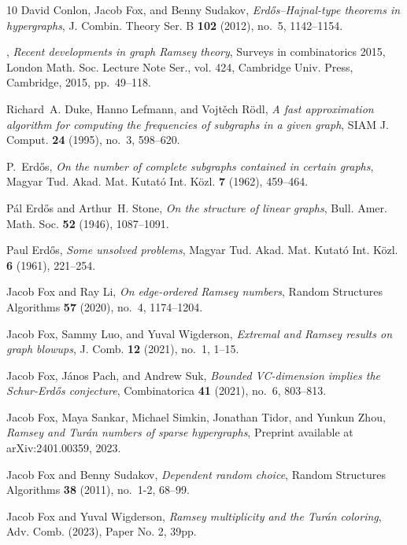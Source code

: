 \documentclass[11pt]{article}
\numberwithin{equation}{section}
\theoremstyle{plain}
\theoremstyle{remark}
\begin{document}
\begin{thebibliography}{10}
David Conlon, Jacob Fox, and Benny Sudakov, \emph{{Erd\H os}--{H}ajnal-type
  theorems in hypergraphs}, J. Combin. Theory Ser. B \textbf{102} (2012),
  no.~5, 1142--1154. 

\bysame, \emph{Recent developments in graph {R}amsey theory}, Surveys in
  combinatorics 2015, London Math. Soc. Lecture Note Ser., vol. 424, Cambridge
  Univ. Press, Cambridge, 2015, pp.~49--118. 

Richard~A. Duke, Hanno Lefmann, and Vojt\v{e}ch R\"{o}dl, \emph{A fast
  approximation algorithm for computing the frequencies of subgraphs in a given
  graph}, SIAM J. Comput. \textbf{24} (1995), no.~3, 598--620. 

P.~Erd\H{o}s, \emph{On the number of complete subgraphs contained in certain
  graphs}, Magyar Tud. Akad. Mat. Kutat\'{o} Int. K\"{o}zl. \textbf{7} (1962),
  459--464. 

P\'{a}l Erd\H{o}s and Arthur~H. Stone, \emph{On the structure of linear
  graphs}, Bull. Amer. Math. Soc. \textbf{52} (1946), 1087--1091. 

Paul Erd\H{o}s, \emph{Some unsolved problems}, Magyar Tud. Akad. Mat.
  Kutat\'{o} Int. K\"{o}zl. \textbf{6} (1961), 221--254. 

Jacob Fox and Ray Li, \emph{On edge-ordered {R}amsey numbers}, Random
  Structures Algorithms \textbf{57} (2020), no.~4, 1174--1204. 

Jacob Fox, Sammy Luo, and Yuval Wigderson, \emph{Extremal and {R}amsey results
  on graph blowups}, J. Comb. \textbf{12} (2021), no.~1, 1--15. 

Jacob Fox, J\'{a}nos Pach, and Andrew Suk, \emph{Bounded {VC}-dimension implies
  the {S}chur-{Erd\H{o}s} conjecture}, Combinatorica \textbf{41} (2021), no.~6,
  803--813. 

Jacob Fox, Maya Sankar, Michael Simkin, Jonathan Tidor, and Yunkun Zhou,
  \emph{{R}amsey and {T}ur\'{a}n numbers of sparse hypergraphs}, Preprint
  available at arXiv:2401.00359, 2023.

Jacob Fox and Benny Sudakov, \emph{Dependent random choice}, Random Structures
  Algorithms \textbf{38} (2011), no.~1-2, 68--99. 

Jacob Fox and Yuval Wigderson, \emph{Ramsey multiplicity and the {T}ur\'an
  coloring}, Adv. Comb. (2023), Paper No. 2, 39pp. 


\end{thebibliography}
\end{document}
